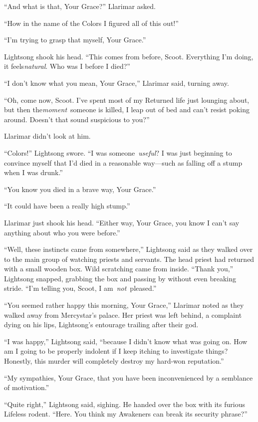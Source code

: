 “And what is that, Your Grace?” Llarimar asked.

“How in the name of the Colors I figured all of this out!”

“I’m trying to grasp that myself, Your Grace.”

Lightsong shook his head. “This comes from before, Scoot. Everything I’m doing, it feels\textit{natural}. Who was I before I died?”

“I don’t know what you mean, Your Grace,” Llarimar said, turning away.

“Oh, come now, Scoot. I’ve spent most of my Returned life just lounging about, but then the\textit{moment}~someone is killed, I leap out of bed and can’t resist poking around. Doesn’t that sound suspicious to you?”

Llarimar didn’t look at him.

“Colors!” Lightsong swore. “I was someone~\textit{useful}? I was just beginning to convince myself that I’d died in a reasonable way—such as falling off a stump when I was drunk.”

“You know you died in a brave way, Your Grace.”

“It could have been a really high stump.”

Llarimar just shook his head. “Either way, Your Grace, you know I can’t say anything about who you were before.”

“Well, these instincts came from somewhere,” Lightsong said as they walked over to the main group of watching priests and servants. The head priest had returned with a small wooden box. Wild scratching came from inside. “Thank you,” Lightsong snapped, grabbing the box and passing by without even breaking stride. “I’m telling you, Scoot, I am~\textit{not}~pleased.”

“You seemed rather happy this morning, Your Grace,” Llarimar noted as they walked away from Mercystar’s palace. Her priest was left behind, a complaint dying on his lips, Lightsong’s entourage trailing after their god.

“I was happy,” Lightsong said, “because I didn’t know what was going on. How am I going to be properly indolent if I keep itching to investigate things? Honestly, this murder will completely destroy my hard-won reputation.”

“My sympathies, Your Grace, that you have been inconvenienced by a semblance of motivation.”

“Quite right,” Lightsong said, sighing. He handed over the box with its furious Lifeless rodent. “Here. You think my Awakeners can break its security phrase?”

